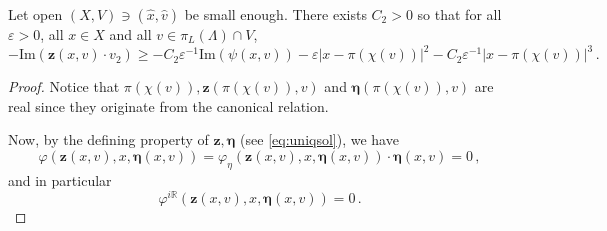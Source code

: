\documentclass[
	fontsize=11pt, 
	twoside=false, 
	abstract=true, 
	a4paper,
]{scrartcl}
\newcommand{\eps}{\varepsilon}
\newcommand{\RR}{\mathbb{R}}
\newcommand{\abs}[1]{\left\lvert#1\right\rvert}
\newcommand{\an}{\quad\text{and}\quad}
\begin{document}
\begin{lemma}[{\cite[Lem.~5.16]{2306.05906v1}}]
	Let open $(X,V)\ni (\hat x,\hat v)$ be small enough. There exists $C_2>0$ so that for all $\eps >0$, all $x\in X$ and all $v\in \pi_L(\Lambda) \cap V$,
	\begin{equation}\label{eq:zdotv2estimate}
		-\mathrm{Im}(\mathbf{z}(x,v)\cdot v_2)\geq -C_2\varepsilon^{-1}\mathrm{Im}(\psi(x,v))-\varepsilon\abs{x-\pi(\chi(v))}^2 - C_2\varepsilon^{-1}\abs{x-\pi(\chi(v))}^3\,.	
	\end{equation}
\end{lemma}
\begin{proof}
	Notice that $\pi(\chi(v)),\mathbf{z}(\pi(\chi(v)),v)$ and $\bm{\eta}(\pi(\chi(v)),v)$ are real since they originate from the canonical relation. 


%
	Now, by the defining property of $\mathbf{z},\bm{\eta}$ (see \cref{eq:uniqsol}), we have
	\[
		\varphi(\mathbf{z}(x,v),x,\bm{\eta}(x,v)) = \varphi_\eta(\mathbf{z}(x,v),x,\bm{\eta}(x,v)) \cdot \bm{\eta}(x,v) = 0\,,
	\]
	and in particular 
	\begin{equation}\label{eq:first0}
		\varphi^{i\RR}(\mathbf{z}(x,v),x,\bm{\eta}(x,v)) = 0\,.
	\end{equation}
	

\end{proof}
\end{document}
